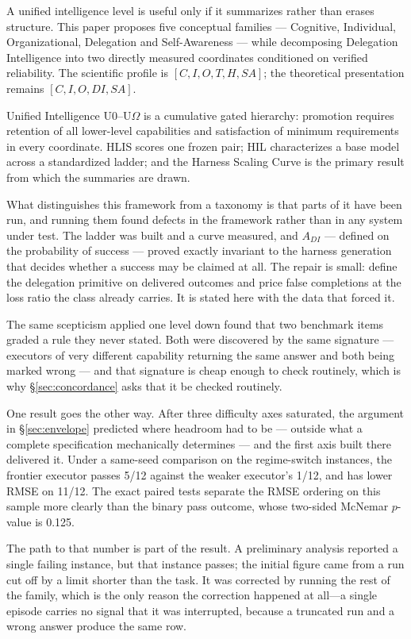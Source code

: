 \documentclass[11pt]{article}
\theoremstyle{definition}
\newcommand{\Om}{\ensuremath{\Omega}}
\begin{document}
A unified intelligence level is useful only if it summarizes rather than erases structure. This paper proposes five conceptual families --- Cognitive, Individual, Organizational, Delegation and Self-Awareness --- while decomposing Delegation Intelligence into two directly measured coordinates conditioned on verified reliability. The scientific profile is $[C, I, O, T, H, SA]$; the theoretical presentation remains $[C, I, O, DI, SA]$.

Unified Intelligence U0--U\Om{} is a cumulative gated hierarchy: promotion requires retention of all lower-level capabilities and satisfaction of minimum requirements in every coordinate. HLIS scores one frozen pair; HIL characterizes a base model across a standardized ladder; and the Harness Scaling Curve is the primary result from which the summaries are drawn.

What distinguishes this framework from a taxonomy is that parts of it have been run, and running them found defects in the framework rather than in any system under test. The ladder was built and a curve measured, and $A_{DI}$ --- defined on the probability of success --- proved exactly invariant to the harness generation that decides whether a success may be claimed at all. The repair is small: define the delegation primitive on delivered outcomes and price false completions at the loss ratio the class already carries. It is stated here with the data that forced it.

The same scepticism applied one level down found that two benchmark items graded a rule they never stated. Both were discovered by the same signature --- executors of very different capability returning the same answer and both being marked wrong --- and that signature is cheap enough to check routinely, which is why \S\ref{sec:concordance} asks that it be checked routinely.

One result goes the other way. After three difficulty axes saturated, the argument in \S\ref{sec:envelope} predicted where headroom had to be --- outside what a complete specification mechanically determines --- and the first axis built there delivered it. Under a same-seed comparison on the regime-switch instances, the frontier executor passes 5/12 against the weaker executor's 1/12, and has lower RMSE on 11/12. The exact paired tests separate the RMSE ordering on this sample more clearly than the binary pass outcome, whose two-sided McNemar $p$-value is 0.125.

The path to that number is part of the result. A preliminary analysis reported a single failing instance, but that instance passes; the initial figure came from a run cut off by a limit shorter than the task. It was corrected by running the rest of the family, which is the only reason the correction happened at all---a single episode carries no signal that it was interrupted, because a truncated run and a wrong answer produce the same row.
\end{document}
